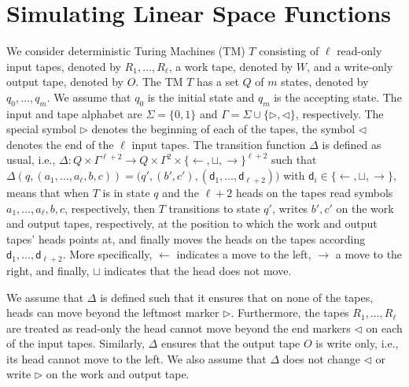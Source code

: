 \section*{Simulating Linear Space Functions}
We consider  deterministic Turing Machines  (TM) $T$ consisting of $\ell$ read-only input tapes, denoted by $R_1,\ldots,R_\ell$,
a work tape, denoted by $W$, and a write-only output tape, denoted by $O$. The TM $T$ has a set $Q$ of $m$
states, denoted by $q_0,\ldots,q_m$. We assume that $q_0$ is the initial state and $q_m$ is the accepting state.
The input and tape alphabet are $\Sigma=\{0,1\}$ and $\Gamma=\Sigma\cup\{\rhd,\lhd\}$, respectively. The special symbol $\rhd$ denotes the beginning of each of the tapes, the symbol $\lhd$ denotes the end of the $\ell$ input tapes. The transition function $\Delta$ is defined as usual, i.e., 
$\Delta:Q\times \Gamma^{\ell+2} \to Q\times \Gamma^{2}\times \{\leftarrow,\sqcup,\rightarrow\}^{\ell+2}$ such that $\Delta(q,(a_1,\ldots,a_{\ell},b,c))=\bigl(q',(b',c'),(\mathsf{d}_1,\ldots,\mathsf{d}_{\ell+2})\bigr)$ with $\mathsf{d}_i\in \{\leftarrow,\sqcup,\rightarrow\}$, means that when $T$ is in state $q$ and the $\ell+2$ heads on the tapes read symbols $a_1,\ldots,a_{\ell},b,c$, respectively, then $T$ transitions to state $q'$, writes $b',c'$ on the work and output tapes, respectively, at the position to which the work and output tapes' heads points at, and finally moves the heads on the tapes according $\mathsf{d}_1,\ldots,\mathsf{d}_{\ell+2}$. More specifically, $\leftarrow$  indicates a move to the left, 
$\rightarrow$ a move to the right, and finally, $\sqcup$ indicates that the head does not move.

We assume that $\Delta$ is defined such that it ensures that on none of the tapes, heads can move beyond the leftmost marker $\rhd$. Furthermore, the tapes $R_1,\ldots,R_\ell$ are treated as read-only the head cannot move beyond the end markers $\lhd$ on each of the input tapes. Similarly, $\Delta$ ensures that the output tape $O$ is write only, i.e., its head cannot move to the left.  We also assume that $\Delta$ does not change $\lhd$ or write $\rhd$ on the work and output tape.

